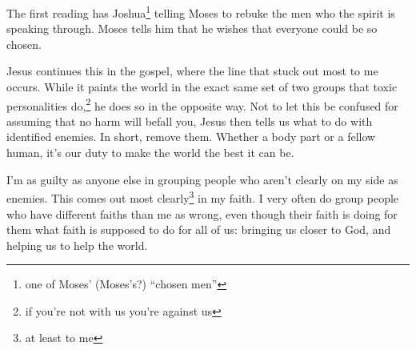 \documentclass[12pt]{article}[titlepage]
\newcommand{\say}[1]{``#1''}
\newcommand{\1}{\={a}}
\newcommand{\2}{\={e}}
\newcommand{\3}{\={\i}}
\newcommand{\4}{\=o}
\newcommand{\5}{\=u}
\newcommand{\6}{\={A}}
\renewcommand{\,}{\textsuperscript{,}}
\begin{document}
The first reading has Joshua\footnote{one of Moses' (Moses's?) \say{chosen men}} telling Moses to rebuke the men who the spirit is speaking through.
Moses tells him that he wishes that everyone could be so chosen.

Jesus continues this in the gospel, where the line that stuck out most to me occurs.
While it paints the world in the exact same set of two groups that toxic personalities do,\footnote{if you're not with us you're against us} he does so in the opposite way.
Not to let this be confused for assuming that no harm will befall you, Jesus then tells us what to do with identified enemies.
In short, remove them.
Whether a body part or a fellow human, it's our duty to make the world the best it can be.

I'm as guilty as anyone else in grouping people who aren't clearly on my side as enemies.
This comes out most clearly\footnote{at least to me} in my faith.
I very often do group people who have different faiths than me as wrong, even though their faith is doing for them what faith is supposed to do for all of us: bringing us closer to God, and helping us to help the world.
\end{document}
